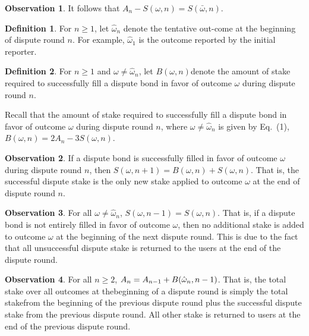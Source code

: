\documentclass[12pt,floatfix,reprint,nofootinbib,amsmath,amssymb,epsfig,pre,floats,letterpaper,groupedaffiliation]{revtex4-1}
\theoremstyle{definition}
\newtheorem{observation}{Observation}
\theoremstyle{definition}
\newtheorem{definition}{Definition}
\begin{document}
\begin{observation}
It follows that $A_n - S(\omega, n) = S(\bar{\omega}, n)$.
\end{observation}

\begin{definition}
For $n \geq 1$, let $\hat{\omega}_n$ denote the tentative out-\linebreak come at the beginning of dispute round $n$. For example, $\hat{\omega}_1$ is the outcome reported by the initial reporter.
\end{definition}

\begin{definition}
For $n \geq 1$ and $\omega \neq \hat{\omega}_n$, let $B(\omega, n)$\linebreak denote the amount of stake required to successfully fill a dispute bond in favor of outcome $\omega$ during dispute round $n$.
\end{definition}

Recall that the amount of stake required to successfully fill a dispute bond in favor of outcome $\omega$ during dispute round $n$, where $\omega \neq \hat{\omega}_n$ is given by Eq.~(1), $B(\omega, n) = 2A_n - 3S(\omega, n)$.

\begin{observation}
If a dispute bond is successfully filled in favor of outcome $\omega$ during dispute round $n$, then $S(\omega, n+1) = B(\omega, n) + S(\omega, n)$. That is, the successful dispute stake is the only new stake applied to outcome $\omega$ at the end of dispute round $n$.
\end{observation}

\begin{observation}
For all $\omega \neq \hat{\omega}_n$, $S(\omega, n-1) = S(\omega, n)$. That is, if a dispute bond is not entirely filled in favor of outcome $\omega$, then no additional stake is added to outcome $\omega$ at the beginning of the next dispute round. This is due to the fact that all unsuccessful dispute stake is returned to the users at the end of the dispute round.
\end{observation}

\begin{observation}
For all $n \geq 2$, $A_n = A_{n-1} + B(\hat{\omega}_n, n-\linebreak 1)$. That is, the total stake over all outcomes at the\linebreak beginning of a dispute round is simply the total stake\linebreak from the beginning of the previous dispute round plus the successful dispute stake from the previous dispute round. All other stake is returned to users at the end of the previous dispute round.
\end{observation}
\end{document}

